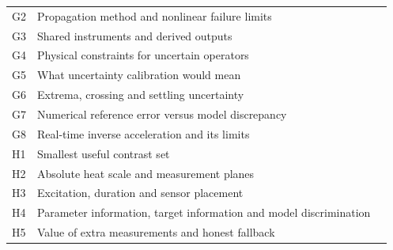 \begin{longtable}{@{}p{0.45in}p{4.85in}p{0.40in}@{}}
G2 & Propagation method and nonlinear failure limits & \hyperref[topic:propagation-method-and-nonlinear-failure-limits]{\pageref*{topic:propagation-method-and-nonlinear-failure-limits}}\\
G3 & Shared instruments and derived outputs & \hyperref[topic:shared-instruments-and-derived-outputs]{\pageref*{topic:shared-instruments-and-derived-outputs}}\\
G4 & Physical constraints for uncertain operators & \hyperref[topic:physical-constraints-for-uncertain-operators]{\pageref*{topic:physical-constraints-for-uncertain-operators}}\\
G5 & What uncertainty calibration would mean & \hyperref[topic:what-uncertainty-calibration-would-mean]{\pageref*{topic:what-uncertainty-calibration-would-mean}}\\
G6 & Extrema, crossing and settling uncertainty & \hyperref[topic:extrema-crossing-and-settling-uncertainty]{\pageref*{topic:extrema-crossing-and-settling-uncertainty}}\\
G7 & Numerical reference error versus model discrepancy & \hyperref[topic:numerical-reference-error-versus-model-discrepancy]{\pageref*{topic:numerical-reference-error-versus-model-discrepancy}}\\
G8 & Real-time inverse acceleration and its limits & \hyperref[topic:real-time-inverse-acceleration-and-its-limits]{\pageref*{topic:real-time-inverse-acceleration-and-its-limits}}\\
H1 & Smallest useful contrast set & \hyperref[topic:smallest-useful-contrast-set]{\pageref*{topic:smallest-useful-contrast-set}}\\
H2 & Absolute heat scale and measurement planes & \hyperref[topic:absolute-heat-scale-and-measurement-planes]{\pageref*{topic:absolute-heat-scale-and-measurement-planes}}\\
H3 & Excitation, duration and sensor placement & \hyperref[topic:excitation-duration-and-sensor-placement]{\pageref*{topic:excitation-duration-and-sensor-placement}}\\
H4 & Parameter information, target information and model discrimination & \hyperref[topic:parameter-information-target-information-and-model-discrimination]{\pageref*{topic:parameter-information-target-information-and-model-discrimination}}\\
H5 & Value of extra measurements and honest fallback & \hyperref[topic:value-of-extra-measurements-and-honest-fallback]{\pageref*{topic:value-of-extra-measurements-and-honest-fallback}}\\

\end{longtable}
